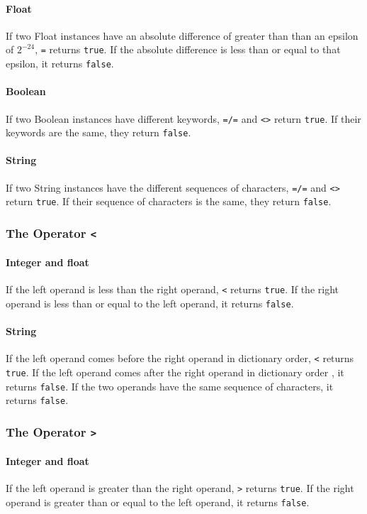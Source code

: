 \paragraph{Float}
If two Float instances have an absolute difference of greater than than an epsilon of $2^{-24}$, \verb!=! returns \verb!true!. If the absolute difference is less than or equal to that epsilon, it returns \verb!false!.
\paragraph{Boolean}
If two Boolean instances have different keywords, \verb!=/=! and \verb!<>! return \verb!true!. If their keywords are the same, they return \verb!false!.
\paragraph{String}
If two String instances have the different sequences of characters, \verb!=/=! and \verb!<>! return \verb!true!. If their sequence of characters is the same, they return \verb!false!.

\subsubsection{The Operator {\tt <}}
\paragraph{Integer and float}
If the left operand is less than the right operand, \verb!<! returns \verb!true!. If the right operand is less than or equal to the left operand, it returns \verb!false!.
\paragraph{String}
If the left operand comes before the right operand in dictionary order, \verb!<! returns \verb!true!. If the left operand comes after the right operand in dictionary order , it returns \verb!false!. If the two operands have the same sequence of characters, it returns \verb!false!.

\subsubsection{The Operator {\tt >}}
\paragraph{Integer and float}
If the left operand is greater than the right operand, \verb!>! returns \verb!true!. If the right operand is greater than or equal to the left operand, it returns \verb!false!.
